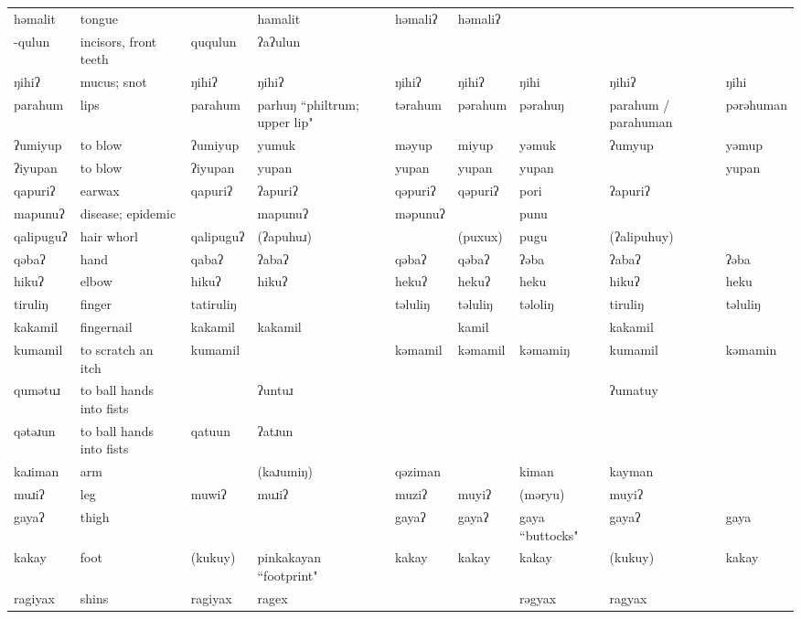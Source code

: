 \begin{landscape}
\begin{longtable}{*{9}{p{}}}
\text{*}həmalit & tongue &  & hamalit & həmaliʔ & həmaliʔ &  &  & \\
\text{*}-qulun & incisors, front teeth & ququlun & ʔaʔulun &  &  &  &  & \\
\text{*}ŋihiʔ & mucus; snot & ŋihiʔ & ŋihiʔ & ŋihiʔ & ŋihiʔ & ŋihi & ŋihiʔ & ŋihi\\
\text{*}parahum & lips & parahum & parhuŋ ``philtrum; upper lip" & tərahum & pərahum & pərahuŋ & parahum / parahuman & pərəhuman\\
\text{*}ʔumiyup & to blow & ʔumiyup & yumuk & məyup & miyup & yəmuk & ʔumyup & yəmup\\
\text{*}ʔiyupan & to blow & ʔiyupan & yupan & yupan & yupan & yupan &  & yupan\\
\text{*}qapuriʔ & earwax & qapuriʔ & ʔapuriʔ & qəpuriʔ & qəpuriʔ & pori & ʔapuriʔ & \\
\text{*}mapunuʔ & disease; epidemic &  & mapunuʔ & məpunuʔ &  & punu &  & \\
\text{*}qalipuguʔ & hair whorl & qalipuguʔ & (ʔapuhuɹ) &  & (puxux) & pugu & (ʔalipuhuy) & \\
\text{*}qəbaʔ & hand & qabaʔ & ʔabaʔ & qəbaʔ & qəbaʔ & ʔəba & ʔabaʔ & ʔəba\\
\text{*}hikuʔ & elbow & hikuʔ & hikuʔ & hekuʔ & hekuʔ & heku & hikuʔ & heku\\
\text{*}tiruliŋ & finger & tatiruliŋ &  & təluliŋ & təluliŋ & təloliŋ & tiruliŋ & təluliŋ\\
\text{*}kakamil & fingernail & kakamil & kakamil &  & kamil &  & kakamil & \\
\text{*}kumamil & to scratch an itch & kumamil &  & kəmamil & kəmamil & kəmamiŋ & kumamil & kəmamin\\
\text{*}qumətuɹ & to ball hands into fists &  & ʔuntuɹ &  &  &  & ʔumatuy & \\
\text{*}qətəɹun & to ball hands into fists & qatuun & ʔatɹun &  &  &  &  & \\
\text{*}kaɹiman & arm &  & (kaɹumiŋ) & qəziman &  & kiman & kayman & \\
\text{*}muɹiʔ & leg & muwiʔ & muɹiʔ & muziʔ & muyiʔ & (məryu) & muyiʔ & \\
\text{*}gayaʔ & thigh &  &  & gayaʔ & gayaʔ & gaya ``buttocks" & gayaʔ & gaya\\
\text{*}kakay & foot & (kukuy) & pinkakayan ``footprint" & kakay & kakay & kakay & (kukuy) & kakay\\
\text{*}ragiyax & shins & ragiyax & ragex &  &  & rəgyax & ragyax & \\

\end{longtable}
\end{landscape}
